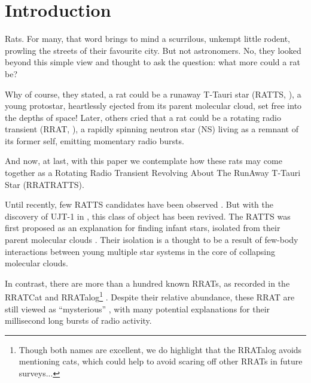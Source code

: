 \documentclass[twocolumn, twocolappendix]{aastex631}
\newcommand{\tauriRAT}{RATTS\xspace}
\newcommand{\radioRAT}{RRAT\xspace}
\newcommand{\binaryRAT}{RRATRATTS\xspace}
\begin{document}

\section{Introduction}
Rats. For many, that word brings to mind a scurrilous, unkempt little rodent, prowling the streets of their favourite city. But not astronomers. No, they looked beyond this simple view and thought to ask the question: what more could a rat be?

Why of course, they stated, a rat could be a runaway T-Tauri star (\tauriRAT, \citealp{Sterzik+1995}), a young protostar, heartlessly ejected from its parent molecular cloud, set free into the depths of space! Later, others cried that a rat could be a rotating radio transient (\radioRAT, \citealp{McLaughlin+2006}), a rapidly spinning neutron star (NS) living as a remnant of its former self, emitting momentary radio bursts.

And now, at last, with this paper we contemplate how these rats may come together as a Rotating Radio Transient Revolving About The RunAway T-Tauri Star (\binaryRAT).%

Until recently, few \tauriRAT candidates have been observed \citep[e.g.][]{Neuhauser+1996,Neuhaeuser+1997}. But with the discovery of UJT-1 in \citet{Marti+2023}, this class of object has been revived. The \tauriRAT was first proposed as an explanation for finding infant stars, isolated from their parent molecular clouds \citep{Sterzik+1995, Sterzik+1995b}. Their isolation is a thought to be a result of few-body interactions between young multiple star systems in the core of collapsing molecular clouds.

In contrast, there are more than a hundred known \radioRAT{}s, as recorded in the RRATCat \citep{RRATCat} and RRATalog\footnote{Though both names are excellent, we do highlight that the RRATalog avoids mentioning cats, which could help to avoid scaring off other \radioRAT{}s in future surveys...} \citep{RRATalog}. Despite their relative abundance, these \radioRAT{} are still viewed as ``mysterious'' \citep[e.g.][]{mysterious_RRAT}, with many potential explanations for their millisecond long bursts of radio activity.
\end{document}
